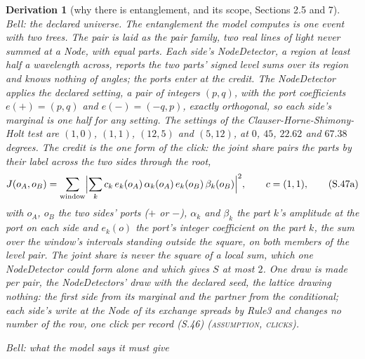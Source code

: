 \documentclass[pdflatex,sn-mathphys-num]{sn-jnl}
\newcommand{\claimmark}[1]{\textup{\textsc{#1}}}
\newcommand{\fence}[1]{\textup{\textsc{#1}}}
\theoremstyle{thmstyleone}
\newtheorem{derivation}{Derivation}
\begin{document}
\begin{derivation}[why there is entanglement, and its scope, Sections 2.5 and 7]
\emph{Bell: the declared universe.} The entanglement the model computes is one event with two trees. The pair is laid as the pair family, two real lines of light never summed at a Node, with equal parts. Each side's NodeDetector, a region at least half a wavelength across, reports the two parts' signed level sums over its region and knows nothing of angles; the ports enter at the credit. The NodeDetector applies the declared setting, a pair of integers $(p, q)$, with the port coefficients $e(+) = (p, q)$ and $e(-) = (-q, p)$, exactly orthogonal, so each side's marginal is one half for any setting. The settings of the Clauser-Horne-Shimony-Holt test are $(1, 0)$, $(1, 1)$, $(12, 5)$ and $(5, 12)$, at $0$, $45$, $22.62$ and $67.38$ degrees. The credit is the one form of the click: the joint share pairs the parts by their label across the two sides through the root,
\begin{equation}
J(o_A, o_B) = \sum_{\text{window}}\Bigl|\sum_k c_k\,e_k(o_A)\,\alpha_k(o_A)\,e_k(o_B)\,\beta_k(o_B)\Bigr|^2, \qquad c = (1, 1), \tag{S.47a}
\end{equation}
with $o_A$, $o_B$ the two sides' ports ($+$ or $-$), $\alpha_k$ and $\beta_k$ the part $k$'s amplitude at the port on each side and $e_k(o)$ the port's integer coefficient on the part $k$, the sum over the window's intervals standing outside the square, on both members of the level pair. The joint share is never the square of a local sum, which one NodeDetector could form alone and which gives $S$ at most $2$. One draw is made per pair, the NodeDetectors' draw with the declared seed, the lattice drawing nothing: the first side from its marginal and the partner from the conditional; each side's write at the Node of its exchange spreads by Rule3 and changes no number of the row, one click per record (S.46) (\claimmark{assumption}, \fence{clicks}).

\emph{Bell: what the model says it must give}


\end{derivation}
\end{document}
